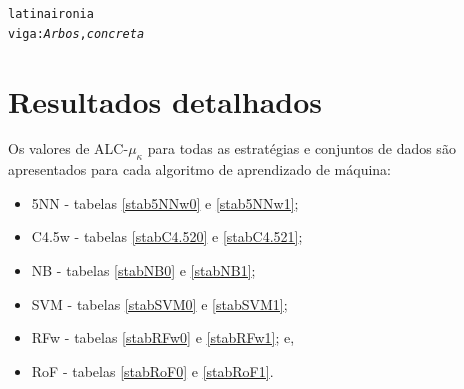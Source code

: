 \documentclass[doutorado, pos-defesa, spanish, english, brazil, versalete, sumario=tradicional]{packages/icmc}
\begin{document}
\begin{anexosenv}
\begin{alltt}
              latina ironia
              viga: \textit{Arbos},     \textit{concreta}  
\end{alltt}




\chapter{Resultados detalhados} \label{anresdet}
Os valores de ALC-$\mu_\kappa$ para todas as estratégias e conjuntos de dados são apresentados para cada algoritmo de aprendizado de máquina:
\begin{itemize}
   \item 5NN - tabelas \ref{stab5NNw0} e \ref{stab5NNw1};
   \item C4.5w - tabelas \ref{stabC4.520} e \ref{stabC4.521};
   \item NB - tabelas \ref{stabNB0} e \ref{stabNB1};
   \item SVM - tabelas \ref{stabSVM0} e \ref{stabSVM1};
   \item RFw - tabelas \ref{stabRFw0} e \ref{stabRFw1}; e,
   \item RoF - tabelas \ref{stabRoF0} e \ref{stabRoF1}.
\end{itemize}


\end{anexosenv}
\end{document}
